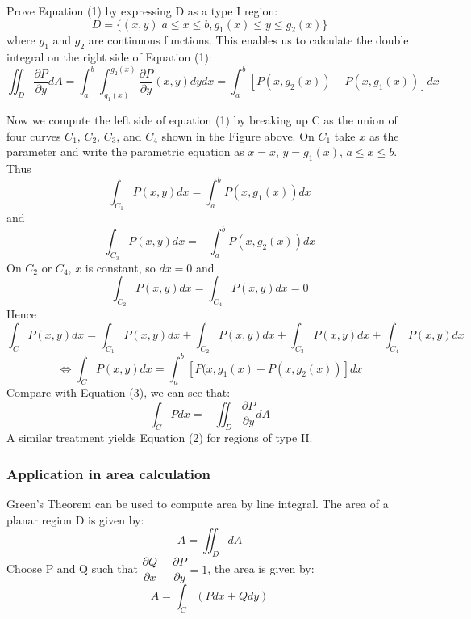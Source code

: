 \documentclass[a4paper]{article}
\begin{document}
\begin{center}
\end{center}
Prove Equation (1) by expressing D as a type I region:
\[D=\{(x,y)|a\leq x \leq b,g_1(x) \leq y \leq g_2(x)\}\]
where $g_1$ and $g_2$ are continuous functions. This enables us to calculate the double integral on the right side of Equation (1):
\begin{equation}
    \iint_D \dfrac{\partial P}{\partial y}dA=\int_a^b \int_{g_1(x)}^{g_2(x)} \dfrac{\partial P}{\partial y}(x,y)dy dx=\int_a^b [P(x,g_2(x))-P(x,g_1(x))]dx
\end{equation}

Now we compute the left side of equation (1) by breaking up C as the union of four curves $C_1$, $C_2$, $C_3$, and $C_4$ shown in the Figure above. On $C_1$ take $x$ as the parameter and write the parametric equation as $x=x$, $y=g_1(x)$, $a\leq x \leq b$. Thus
\[\int_{C_1}P(x,y)dx=\int_a^b P(x,g_1(x))dx\]
and
\[\int_{C_3}P(x,y)dx=-\int_a^b P(x,g_2(x))dx\]
On $C_2$ or $C_4$, $x$ is constant, so $dx=0$ and 
\[\int_{C_2}P(x,y)dx=\int_{C_4}P(x,y)dx=0\]
Hence
\[\int_C P(x,y)dx=\int_{C_1}P(x,y)dx +\int_{C_2}P(x,y)dx+ \int_{C_3}P(x,y)dx+\int_{C_4}P(x,y)dx\]
\[\Leftrightarrow \int_C P(x,y)dx=\int_a^b [P(x,g_1(x) -P(x,g_2(x))]dx\]
 Compare with Equation (3), we can see that:
 \[\int_C Pdx=-\iint_{D} \dfrac{\partial P}{\partial y}dA\]
 A similar treatment yields Equation (2) for regions of type II.
 \subsubsection{Application in area calculation}
 Green's Theorem can be used to compute area by line integral. The area of a planar region 
D is given by:
\[A=\iint_D dA\]
Choose P and Q such that $\dfrac{\partial Q}{\partial x}-\dfrac{\partial P}{\partial y}=1$, the area is given by:
\[A=\int_C (Pdx+Qdy)\]
\end{document}
